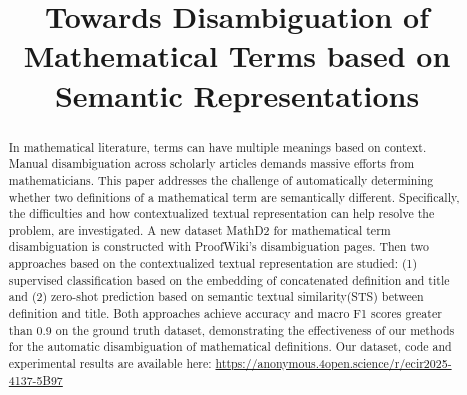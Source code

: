 \documentclass[runningheads]{llncs}
\begin{document}
%
\title{Towards 
Disambiguation of Mathematical Terms based on Semantic Representations}
%
%
%
%
 
%
\maketitle              %
%
\begin{abstract}
In mathematical literature, terms can have multiple meanings based on context. Manual disambiguation across scholarly articles demands massive efforts from mathematicians. 
This paper addresses the challenge of automatically determining whether two definitions of a mathematical term are semantically different.
Specifically, the difficulties and how contextualized textual representation can help resolve the problem, are investigated.
A new dataset MathD2 for %
mathematical term disambiguation is constructed with ProofWiki's disambiguation pages. %
Then two approaches based on the contextualized textual representation %
are studied: (1) supervised classification based on the embedding of concatenated definition and title and (2) zero-shot prediction based on semantic textual similarity(STS) %
between definition and title. 
Both approaches achieve accuracy and macro F1 scores greater than 0.9 on the ground truth dataset, demonstrating the effectiveness of our methods for the automatic disambiguation of mathematical definitions. Our dataset, code and experimental results are available here: \url{https://anonymous.4open.science/r/ecir2025-4137-5B97} %

\end{abstract}
%
\end{document}
